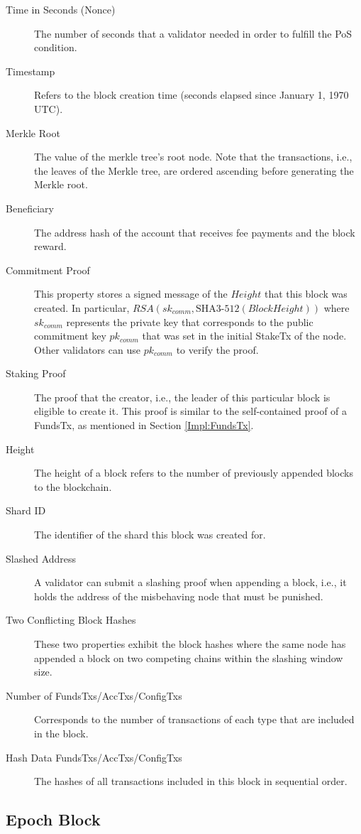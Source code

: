 \begin{description}
  \item[Time in Seconds (Nonce)] The number of seconds that a validator needed in order to fulfill the PoS condition.
  \item[Timestamp] Refers to the block creation time (seconds elapsed since January 1, 1970 UTC).
  \item[Merkle Root] The value of the merkle tree's root node. Note that the transactions, i.e., the leaves of the Merkle tree, are ordered ascending before generating the Merkle root.
  \item[Beneficiary] The address hash of the account that receives fee payments and the block reward.
  \item[Commitment Proof] This property stores a signed message of the $Height$ that this block was created. In particular, $RSA(sk_{comm}, \text{SHA3-512}(BlockHeight))$ where $sk_{comm}$ represents the private key that corresponds to the public commitment key $pk_{comm}$ that was set in the initial StakeTx of the node. Other validators can use $pk_{comm}$ to verify the proof.
  \item[Staking Proof] The proof that the creator, i.e., the leader of this particular block is eligible to create it. This proof is similar to the self-contained proof of a FundsTx, as mentioned in Section \ref{Impl:FundsTx}.
  \item[Height] The height of a block refers to the number of previously appended blocks to the blockchain.
  \item[Shard ID] The identifier of the shard this block was created for.
  \item[Slashed Address] A validator can submit a slashing proof when appending a block, i.e., it holds the address of the misbehaving node that must be punished.
  \item[Two Conflicting Block Hashes] These two properties exhibit the block hashes where the same node has appended a block on two competing chains within the slashing window size.
  \item[Number of FundsTxs/AccTxs/ConfigTxs] Corresponds to the number of transactions of each type that are included in the block.
  \item[Hash Data FundsTxs/AccTxs/ConfigTxs] The hashes of all transactions included in this block in sequential order.
\end{description}

\subsection{Epoch Block}
\label{Impl:EpochBlock}

